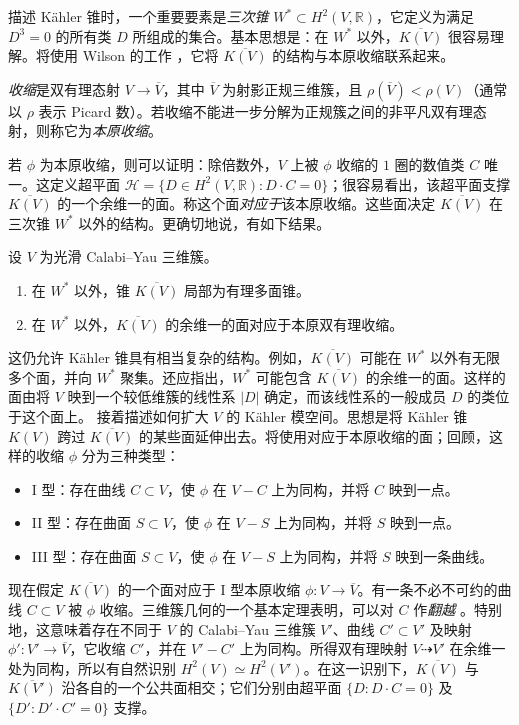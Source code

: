描述 Kähler 锥时，一个重要要素是\emph{三次锥} $W^*\subset H^2(V,\mathbb R)$，它定义为满足 $D^3=0$ 的所有类 $D$ 所组成的集合。基本思想是：在 $W^*$ 以外，$\overline{K(V)}$ 很容易理解。将使用 Wilson 的工作 ，它将 $\overline{K(V)}$ 的结构与本原收缩联系起来。
\begin{definition}\label{def:primitive-contraction}
\emph{收缩}是双有理态射 $V\to\overline V$，其中 $\overline V$ 为射影正规三维簇，且 $\rho(\overline V)<\rho(V)$（通常以 $\rho$ 表示 Picard 数）。若收缩不能进一步分解为正规簇之间的非平凡双有理态射，则称它为\emph{本原收缩}。
\end{definition}
若 $\phi$ 为本原收缩，则可以证明：除倍数外，$V$ 上被 $\phi$ 收缩的 $1$ 圈的数值类 $C$ 唯一。这定义超平面 $\mathcal H=\{D\in H^2(V,\mathbb R):D\cdot C=0\}$；很容易看出，该超平面支撑 $\overline{K(V)}$ 的一个余维一的面。称这个面\emph{对应于}该本原收缩。这些面决定 $\overline{K(V)}$ 在三次锥 $W^*$ 以外的结构。更确切地说，有如下结果。
\begin{proposition}\label{prop:kahler-cone-contractions}
设 $V$ 为光滑 Calabi--Yau 三维簇。
\begin{enumerate}[label=(\roman*)]
\item 在 $W^*$ 以外，锥 $\overline{K(V)}$ 局部为有理多面锥。
\item 在 $W^*$ 以外，$\overline{K(V)}$ 的余维一的面对应于本原双有理收缩。
\end{enumerate}
\end{proposition}
这仍允许 Kähler 锥具有相当复杂的结构。例如，$\overline{K(V)}$ 可能在 $W^*$ 以外有无限多个面，并向 $W^*$ 聚集。还应指出，$W^*$ 可能包含 $\overline{K(V)}$ 的余维一的面。这样的面由将 $V$ 映到一个较低维簇的线性系 $|D|$ 确定，而该线性系的一般成员 $D$ 的类位于这个面上。
接着描述如何扩大 $V$ 的 Kähler 模空间。思想是将 Kähler 锥 $K(V)$ 跨过 $\overline{K(V)}$ 的某些面延伸出去。将使用对应于本原收缩的面；回顾，这样的收缩 $\phi$ 分为三种类型：
\begin{itemize}
\item I 型：存在曲线 $C\subset V$，使 $\phi$ 在 $V-C$ 上为同构，并将 $C$ 映到一点。
\item II 型：存在曲面 $S\subset V$，使 $\phi$ 在 $V-S$ 上为同构，并将 $S$ 映到一点。
\item III 型：存在曲面 $S\subset V$，使 $\phi$ 在 $V-S$ 上为同构，并将 $S$ 映到一条曲线。
\end{itemize}
现在假定 $\overline{K(V)}$ 的一个面对应于 I 型本原收缩 $\phi:V\to\overline V$。有一条不必不可约的曲线 $C\subset V$ 被 $\phi$ 收缩。三维簇几何的一个基本定理表明，可以对 $C$ 作\emph{翻越} 。特别地，这意味着存在不同于 $V$ 的 Calabi--Yau 三维簇 $V'$、曲线 $C'\subset V'$ 及映射 $\phi':V'\to\overline V$，它收缩 $C'$，并在 $V'-C'$ 上为同构。所得双有理映射 $V\dashrightarrow V'$ 在余维一处为同构，所以有自然识别 $H^2(V)\simeq H^2(V')$。在这一识别下，$\overline{K(V)}$ 与 $\overline{K(V')}$ 沿各自的一个公共面相交；它们分别由超平面 $\{D:D\cdot C=0\}$ 及 $\{D':D'\cdot C'=0\}$ 支撑。

